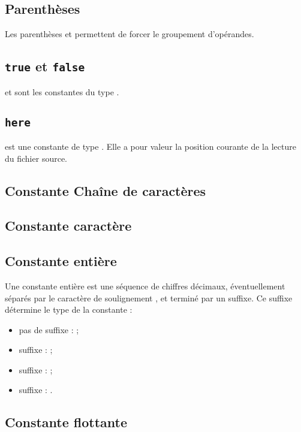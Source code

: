 \subsection{Parenthèses}

Les parenthèses \galgas{(} et \galgas{)} permettent de forcer le groupement d'opérandes.

\subsection{\texttt{true} et \texttt{false}}

 et  sont les constantes du type .

\subsection{\texttt{here}}

 est une constante de type . Elle a pour valeur la position courante de la lecture du fichier source.

\subsection{Constante Chaîne de caractères}

\subsection{Constante caractère}

\subsection{Constante entière}

Une constante entière est une séquence de chiffres décimaux, éventuellement séparés par le caractère de soulignement \galgas{_}, et terminé par un suffixe. Ce suffixe détermine le type de la constante :
\begin{itemize}
  \item pas de suffixe :  ;
  \item suffixe  :  ;
  \item suffixe  :  ;
  \item suffixe  : .
\end{itemize}

\subsection{Constante flottante}

